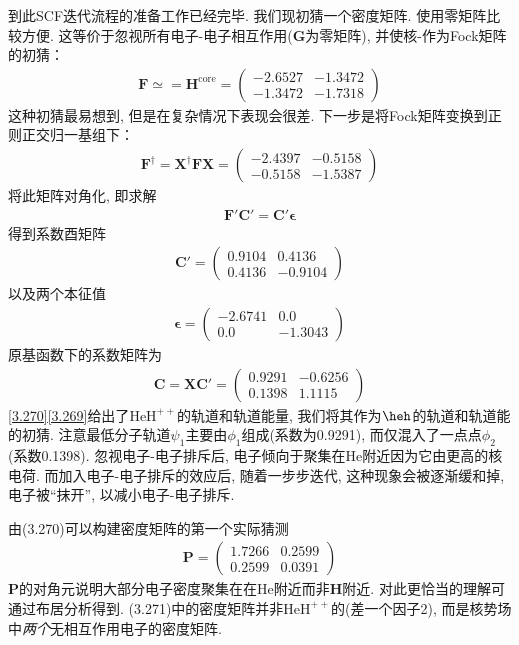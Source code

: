 到此SCF迭代流程的准备工作已经完毕. 
我们现初猜一个密度矩阵. 
使用零矩阵比较方便. 
这等价于忽视所有电子-电子相互作用($\mathbf{G}$为零矩阵), 
并使核-\ha 作为Fock矩阵的初猜：
\begin{align}
	\mathbf{F}\simeq=\mathbf{H}^\mathrm{core}=
	\begin{pmatrix}
		-2.6527&-1.3472\\-1.3472&-1.7318
	\end{pmatrix}
\end{align}
这种初猜最易想到, 
但是在复杂情况下表现会很差. 
下一步是将Fock矩阵变换到正则正交归一基组下：
\begin{align}
	\mathbf{F^\dagger=X^\dagger FX}=
	\begin{pmatrix}
		-2.4397&-0.5158\\-0.5158&-1.5387
	\end{pmatrix}
\end{align}
将此矩阵对角化, 
即求解
\begin{align}
	\mathbf{F'C'=C'}{\boldsymbol\epsilon}
\end{align}
得到系数酉矩阵
\begin{align}
	\mathbf{C'}=
	\begin{pmatrix}
		0.9104&0.4136\\0.4136&-0.9104
	\end{pmatrix}
\end{align}
以及两个本征值
\begin{align}
	\label{3.269}
	\bm{\epsilon}=
	\begin{pmatrix}
		-2.6741&0.0\\0.0&-1.3043
	\end{pmatrix}
\end{align}
原基函数下的系数矩阵为
\begin{align}
	\mathbf{C=XC'}=
	\begin{pmatrix}
		0.9291&-0.6256\\0.1398&1.1115
	\end{pmatrix}
	\label{3.270}
\end{align}
\autoref{3.270}\autoref{3.269}给出了$\mathrm{HeH}^{++}$的轨道和轨道能量, 
我们将其作为$\heh$的轨道和轨道能的初猜. 
注意最低分子轨道$\psi_1$主要由$\phi_1$组成(系数为0.9291), 
而仅混入了一点点$\phi_2$(系数0.1398). 
忽视电子-电子排斥后, 
电子倾向于聚集在$\mathrm{He}$附近因为它由更高的核电荷. 
而加入电子-电子排斥的效应后, 
随着一步步迭代, 
这种现象会被逐渐缓和掉, 
电子被``抹开”, 
以减小电子-电子排斥.


由(3.270)可以构建密度矩阵的第一个实际猜测
\begin{align}
	\mathbf{P}=
	\begin{pmatrix}
		1.7266&0.2599\\0.2599&0.0391
	\end{pmatrix}
\end{align}
$\mathbf{P}$的对角元说明大部分电子密度聚集在在$\mathrm{He}$附近而非$\mathbf{H}$附近. 
对此更恰当的理解可通过布居分析得到. 
(3.271)中的密度矩阵并非$\mathrm{HeH}^{++}$的(差一个因子2), 而是核势场中\emph{两个}无相互作用电子的密度矩阵.

